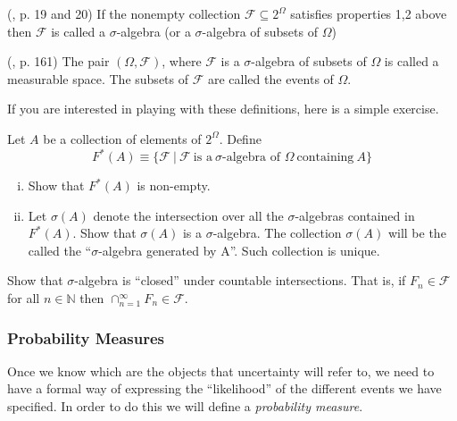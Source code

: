\documentclass[11pt]{article} %
\begin{document}
\begin{definition} (\cite{Billingsley95}, p. 19 and 20)
	If the nonempty collection $\mathcal{F} \subseteq 2^{\Omega}$ satisfies properties 1,2 above then $\mathcal{F}$ is called a $\sigma$-algebra (or a $\sigma$-algebra of subsets of $\Omega$)  
\end{definition}

\begin{definition} (\cite{Billingsley95}, p. 161)
	The pair $(\Omega, \mathcal{F})$, where $\mathcal{F}$ is a $\sigma$-algebra of subsets of $\Omega$ is called a measurable space. The subsets of $\mathcal{F}$ are called the events of $\Omega$.
\end{definition}

\noindent If you are interested in playing with these definitions, here is a simple exercise. \\

\begin{prproblem}[Optional]
Let $A$ be a collection of elements of $2^\Omega$. Define 
$$F^*(A) \equiv \{\mathcal{F} \: | \: \mathcal{F} \: \text{is a} \: \sigma\text{-algebra of } \Omega \: \text{containing} \: A\} $$

\begin{enumerate}[i)]
\item Show that $F^*(A)$ is non-empty. 
\item Let $\sigma(A)$ denote the intersection over all the $\sigma$-algebras contained in $F^*(A)$. Show that $\sigma(A)$ is a $\sigma$-algebra. The collection $\sigma(A)$ will be the called the ``$\sigma$-algebra generated by A''. Such collection is unique.
\end{enumerate}
\end{prproblem}

\begin{prproblem}[Optional] \label{prprob:closed_under_inter}
  Show that $\sigma$-algebra is ``closed'' under countable intersections. That
  is, if $F_n \in \mathcal{F}$ for all $n\in\mathbb{N}$ then $\cap_{n=1}^\infty
  F_n \in \mathcal{F}$.
\end{prproblem}

\subsubsection{Probability Measures}

Once we know which are the objects that uncertainty will refer to, we need to have a formal way of expressing the ``likelihood'' of the different events we have specified. In order to do this we will define a \emph{probability measure}. 
\end{document}
